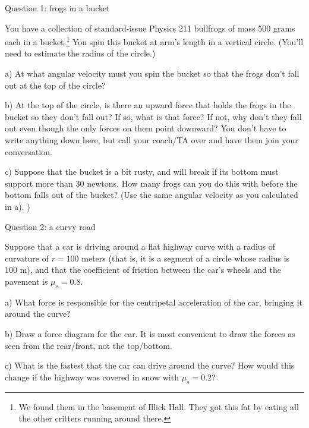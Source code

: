 \documentclass[12pt]{article}
\begin{document}
\Large
\centerline{}
\normalsize
\centerline{}

\medskip

\centerline{\Large Question 1: frogs in a bucket}

You have a collection of standard-issue Physics 211 bullfrogs of mass 500 grams each in a bucket.\footnote{We found them in the basement of Illick Hall. They got this fat by eating all the other critters running around there.}
You spin this bucket at arm's length in a vertical circle. (You'll need to estimate the radius of the circle.)

a) At what angular velocity must you spin the bucket so that the frogs don't fall out at the top of the circle?

\vspace{3in}

b) At the top of the circle, is there an upward force that holds the frogs in the bucket so they don't fall out? If so, what is that force? If not, why don't they fall out even though the only forces on them point downward? You don't have to write anything down here, but call your coach/TA over and have them join your conversation.

\newpage

c) Suppose that the bucket is a bit rusty, and will break if its bottom must support more than 30 newtons. How many frogs can you do this with before the bottom falls out of the bucket? (Use the same angular velocity as you calculated in a). )


\newpage

\centerline{\Large Question 2: a curvy road}

Suppose that a car is driving around a flat highway curve with a radius of curvature of $r=100$ meters (that is, it is a segment of a circle whose
radius is 100 m), and that
the coefficient of friction between the car's wheels and the pavement is $\mu_s=0.8$.

a) What force is responsible for the centripetal acceleration of the car, bringing it around the curve?

\vspace{1in}


b) Draw a force diagram for the car. It is most convenient to draw the forces as seen from the rear/front, not the top/bottom.

\vspace{3in}

c) What is the fastest that the car can drive around the curve? How would this change if the highway
was covered in snow with $\mu_s=0.2$?
\end{document}
